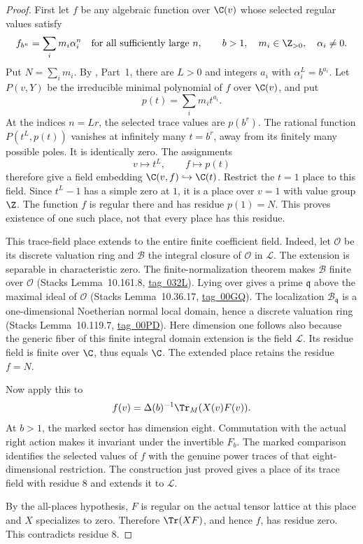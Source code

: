 \begin{proof}
First let $f$ be any algebraic function over $\C(v)$
whose selected regular values satisfy
\[
 f_{b^n}=\sum_i m_i\alpha_i^n
 \quad\text{for all sufficiently large }n,\qquad
 b>1,\quad m_i\in\Z_{>0},\quad\alpha_i\ne0.
\]
Put $N=\sum_i m_i$.
By , Part~1, there are $L>0$ and integers
$a_i$ with $\alpha_i^L=b^{a_i}$.
Let $P(v,Y)$ be the irreducible minimal polynomial of
$f$ over $\C(v)$, and put
\[
 p(t)=\sum_i m_i t^{a_i}.
\]
At the indices $n=Lr$, the selected trace values
are $p(b^r)$. The rational function $P(t^L,p(t))$
vanishes at infinitely many $t=b^r$, away from its
finitely many possible poles. It is identically zero.
The assignments
\[
 v\longmapsto t^L,\qquad f\longmapsto p(t)
\]
therefore give a field embedding
$\C(v,f)\hookrightarrow\C(t)$.
Restrict the $t=1$ place to this field.
Since $t^L-1$ has a simple zero at $1$, it is a place
over $v=1$ with value group $\Z$.
The function $f$ is regular there and has residue
$p(1)=N$.
This proves existence of one such place, not that
every place has this residue.

This trace-field place extends to the entire finite
coefficient field. Indeed, let $\mathcal O$ be its
discrete valuation ring and $\mathcal B$ the integral
closure of $\mathcal O$ in $\mathcal L$.
The extension is separable in characteristic zero.
The finite-normalization theorem makes
$\mathcal B$ finite over $\mathcal O$
(Stacks Lemma~10.161.8,
\href{https://stacks.math.columbia.edu/tag/032L}{tag~032L}).
Lying over gives a prime $\mathfrak q$ above the
maximal ideal of $\mathcal O$
(Stacks Lemma~10.36.17,
\href{https://stacks.math.columbia.edu/tag/00GQ}{tag~00GQ}).
The localization $\mathcal B_{\mathfrak q}$ is a
one-dimensional Noetherian normal local domain,
hence a discrete valuation ring
(Stacks Lemma~10.119.7,
\href{https://stacks.math.columbia.edu/tag/00PD}{tag~00PD}).
Here dimension one follows also because the generic
fiber of this finite integral domain extension is
the field $\mathcal L$.
Its residue field is finite over $\C$, thus equals
$\C$. The extended place retains the residue $f=N$.

Now apply this to
\[
 f(v)=\Delta(b)^{-1}\Tr_M(X(v)F(v)).
\]
At $b>1$, the marked sector has dimension eight.
Commutation with the actual right action makes it
invariant under the invertible $F_b$.
The marked comparison identifies the selected values
of $f$ with the genuine power traces of that
eight-dimensional restriction.
The construction just proved gives a place of its
trace field with residue $8$ and extends it to
$\mathcal L$.

By the all-places hypothesis, $F$ is regular on the
actual tensor lattice at this place and $X$ specializes
to zero. Therefore $\Tr(XF)$, and hence $f$, has
residue zero. This contradicts residue $8$.
\end{proof}


